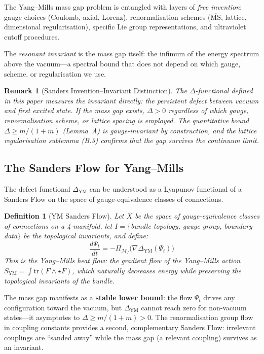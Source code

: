 \documentclass[11pt]{article}
\newtheorem{definition}[theorem]{Definition}
\newtheorem{remark}[theorem]{Remark}
\begin{document}
The Yang--Mills mass gap problem is entangled with layers of \emph{free invention}:
gauge choices (Coulomb, axial, Lorenz), renormalisation schemes
($\overline{\text{MS}}$, lattice, dimensional regularisation), specific Lie group
representations, and ultraviolet cutoff procedures.

The \emph{resonant invariant} is the mass gap itself: the infimum of the energy
spectrum above the vacuum---a spectral bound that does not depend on which gauge,
scheme, or regularisation we use.

\begin{remark}[Sanders Invention--Invariant Distinction]
The $\Delta$-functional defined in this paper measures the invariant directly:
the persistent defect between vacuum and first excited state. If the mass gap
exists, $\Delta > 0$ regardless of which gauge, renormalisation scheme, or
lattice spacing is employed. The quantitative bound $\Delta \geq m/(1+m)$
(Lemma~A) is gauge-invariant by construction, and the lattice regularisation
sublemma (B.3) confirms that the gap survives the continuum limit.
\end{remark}

\subsection*{The Sanders Flow for Yang--Mills}

The defect functional $\Delta_{\mathrm{YM}}$ can be understood as a Lyapunov functional
of a Sanders Flow on the space of gauge-equivalence classes of connections.

\begin{definition}[YM Sanders Flow]
Let $X$ be the space of gauge-equivalence classes of connections on a 4-manifold,
let $I = \{$bundle topology, gauge group, boundary data$\}$ be the topological
invariants, and define:
\[
  \frac{d\Psi_t}{dt} = -\Pi_{\mathcal{M}_I}\!\bigl(\nabla \Delta_{\mathrm{YM}}(\Psi_t)\bigr)
\]
This is the \emph{Yang--Mills heat flow}: the gradient flow of the Yang--Mills action
$S_{\mathrm{YM}} = \int \mathrm{tr}(F \wedge \star F)$, which naturally decreases energy
while preserving the topological invariants of the bundle.
\end{definition}

\noindent
The mass gap manifests as a \textbf{stable lower bound}: the flow $\Psi_t$ drives
any configuration toward the vacuum, but $\Delta_{\mathrm{YM}}$ cannot reach zero for
non-vacuum states---it asymptotes to $\Delta \geq m/(1+m) > 0$. The
renormalisation group flow in coupling constants provides a second, complementary
Sanders Flow: irrelevant couplings are ``sanded away'' while the mass gap (a relevant
coupling) survives as an invariant.
\end{document}
